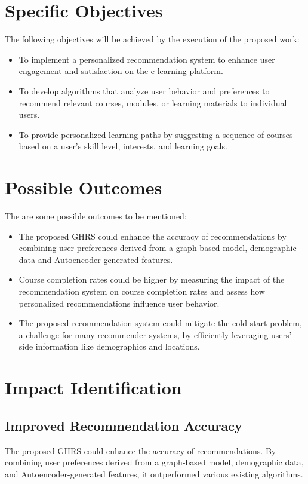 \section{Specific Objectives}
The following objectives will be achieved by the execution of the proposed work:
\begin{itemize}
    \item To implement a personalized recommendation system to enhance user engagement and satisfaction on the e-learning platform. 
    \item To develop algorithms that analyze user behavior and preferences to recommend relevant courses, modules, or learning materials to individual users.
    \item To provide personalized learning paths by suggesting a sequence of courses based on a user's skill level, interests, and learning goals.
\end{itemize}

\section{Possible Outcomes}
The are some possible outcomes to be mentioned:
\begin{itemize}
    \item The proposed GHRS could enhance the accuracy of recommendations by combining user preferences derived from a graph-based model, demographic data and Autoencoder-generated features.
    \item Course completion rates could be higher by measuring  the impact of the recommendation system on course completion rates and assess how personalized recommendations influence user behavior.
    \item The proposed recommendation system could mitigate the cold-start problem, a challenge for many recommender systems, by efficiently leveraging users' side information like demographics and locations.
\end{itemize}

\section{Impact Identification}
\subsection{Improved Recommendation Accuracy}
The proposed GHRS could enhance the accuracy of recommendations. By combining user preferences derived from a graph-based model, demographic data, and Autoencoder-generated features, it outperformed various existing algorithms.

